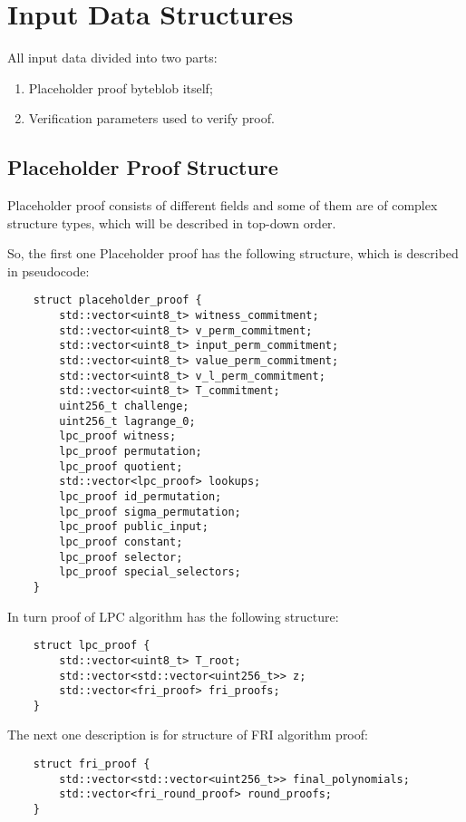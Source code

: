 \section{Input Data Structures}

All input data divided into two parts:

\begin{enumerate}
    \item Placeholder proof byteblob itself;
    \item Verification parameters used to verify proof.
\end{enumerate}

\subsection{Placeholder Proof Structure}

Placeholder proof consists of different fields and some of them are of complex structure types, which will be described in top-down order.

So, the first one Placeholder proof has the following structure, which is described in pseudocode:

\begin{verbatim}
    struct placeholder_proof {
        std::vector<uint8_t> witness_commitment;
        std::vector<uint8_t> v_perm_commitment;
        std::vector<uint8_t> input_perm_commitment;
        std::vector<uint8_t> value_perm_commitment;
        std::vector<uint8_t> v_l_perm_commitment;
        std::vector<uint8_t> T_commitment;
        uint256_t challenge;
        uint256_t lagrange_0;
        lpc_proof witness;
        lpc_proof permutation;
        lpc_proof quotient;
        std::vector<lpc_proof> lookups;
        lpc_proof id_permutation;
        lpc_proof sigma_permutation;
        lpc_proof public_input;
        lpc_proof constant;
        lpc_proof selector;
        lpc_proof special_selectors;
    }
\end{verbatim}

In turn proof of LPC algorithm has the following structure:

\begin{verbatim}
    struct lpc_proof {
        std::vector<uint8_t> T_root;
        std::vector<std::vector<uint256_t>> z;
        std::vector<fri_proof> fri_proofs;
    }
\end{verbatim}

The next one description is for structure of FRI algorithm proof:

\begin{verbatim}
    struct fri_proof {
        std::vector<std::vector<uint256_t>> final_polynomials;
        std::vector<fri_round_proof> round_proofs;
    }
\end{verbatim}

